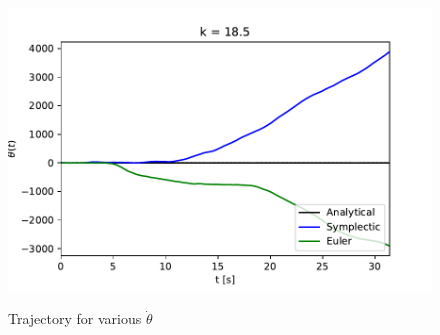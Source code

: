 \begin{figure}[ht!]
\begin{minipage}[b]{0.4\textwidth}
		\label{phaseDot2}
	\end{minipage}
	\hfill
	\begin{minipage}[b]{0.4\textwidth}
	  \includegraphics[scale=0.6]{../figures/k17_nonlin.pdf}
		\label{phaseDot2}
	\end{minipage}
	\caption{Trajectory for various $\dot{\theta}$}
\end{figure}
